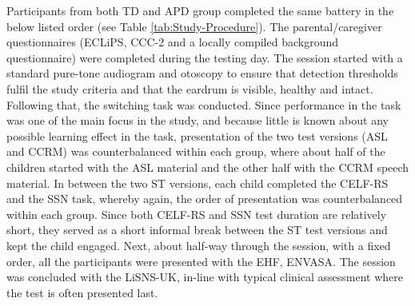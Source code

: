 \documentclass[a4paper, twoside]{templates/ociamthesis}
\begin{document}
Participants from both TD and APD group completed the same battery in the below listed order (see Table \ref{tab:Study-Procedure}). The parental/caregiver questionnaires (ECLiPS, CCC-2 and a locally compiled background questionnaire) were completed during the testing day. The session started with a standard pure-tone audiogram and otoscopy to ensure that detection thresholds fulfil the study criteria and that the eardrum is visible, healthy and intact. Following that, the switching task was conducted. Since performance in the task was one of the main focus in the study, and because little is known about any possible learning effect in the task, presentation of the two test versions (ASL and CCRM) was counterbalanced within each group, where about half of the children started with the ASL material and the other half with the CCRM speech material. In between the two ST versions, each child completed the CELF-RS and the SSN task, whereby again, the order of presentation was counterbalanced within each group. Since both CELF-RS and SSN test duration are relatively short, they served as a short informal break between the ST test versions and kept the child engaged. Next, about half-way through the session, with a fixed order, all the participants were presented with the EHF, ENVASA. The session was concluded with the LiSNS-UK, in-line with typical clinical assessment where the test is often presented last.

\begin{table}

\caption{\label{tab:Study-Procedure}Add caption here.}
\centering
{}
\end{table}
\end{document}
